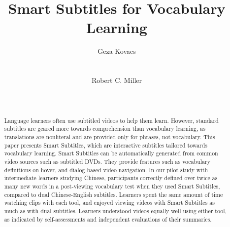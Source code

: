 \documentclass{sigchi}
\begin{document}
\title{Smart Subtitles for Vocabulary Learning}

\author{
  \alignauthor Geza Kovacs \\
    \\
    \\
  \alignauthor Robert C. Miller \\
    \\
    \\
}

\maketitle

\begin{abstract}
Language learners often use subtitled videos to help
them learn. However, standard subtitles
are geared more towards comprehension than vocabulary learning,
as translations are nonliteral and are provided only for phrases, not vocabulary.
This paper presents Smart Subtitles, which are interactive subtitles
tailored towards vocabulary learning.
Smart Subtitles can be automatically generated from common video sources
such as subtitled DVDs.
They provide features such as vocabulary definitions on hover, and
dialog-based video navigation. In our pilot study
with intermediate learners studying Chinese,
participants correctly defined over twice as many new words
in a post-viewing vocabulary test when they used Smart Subtitles, compared to dual
Chinese-English subtitles.
Learners spent the same amount of time watching clips
with each tool, and enjoyed viewing videos
with Smart Subtitles as much as with dual subtitles.
Learners understood videos equally well using either tool,
as indicated by self-assessments
and independent evaluations of their summaries.
\end{abstract}


\end{document}
